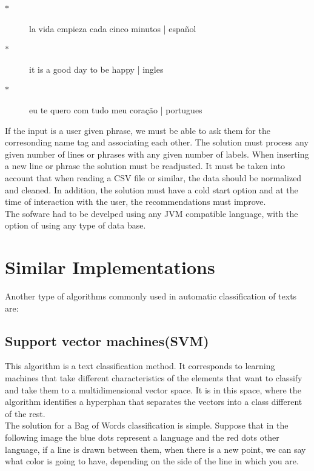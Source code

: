 \documentclass[sigconf,12pt,review=false,natbib=false]{acmart}
\begin{document}
\begin{description}
  \item[$\ast$] la vida empieza cada cinco minutos | español 
  \item[$\ast$] it is a good day to be happy | ingles
  \item[$\ast$] eu te quero com tudo meu coração | portugues \\ 
\end{description}

If the input is a user given phrase, we must be able to ask them for the corresonding name tag and associating each 
other.
The solution must process any given number of lines or phrases with any given number of labels. When inserting a new
line or phrase the solution must be readjusted. It must be taken into account that when reading a CSV file or similar,
the data should be normalized and cleaned. In addition, the solution must have a cold start option and at the time
of interaction with the user, the recommendations must improve. \\

The sofware had to be develped using any JVM compatible language, with the option of using any type of data base.


\section{Similar Implementations}

Another type of algorithms commonly used in automatic classification of texts are:

\subsection{Support vector machines(SVM)}

This algorithm is a text classification method. It corresponds to learning machines that take different characteristics
of the elements that want to classify and take them to a multidimensional vector space. It is in this space, where the
algorithm identifies a hyperphan that separates the vectors into a class different of the rest. \\

The solution for a Bag of Words classification is simple. Suppose that in the following image the blue dots represent
a language and the red dots other language, if a line is drawn between them, when there is a new point, we can say what
color is going to have, depending on the side of the line in which you are. \\
\end{document}
